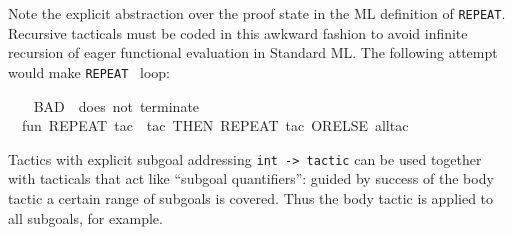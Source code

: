 \begin{isabellebody}
\begin{isamarkuptext}
  \begin{warn}
  Note the explicit abstraction over the proof state in the ML
  definition of \verb|REPEAT|.  Recursive tacticals must be coded in
  this awkward fashion to avoid infinite recursion of eager functional
  evaluation in Standard ML.  The following attempt would make \verb|REPEAT|~ loop:
  \end{warn}%
\end{isamarkuptext}%
\isamarkuptrue%
%
\isadelimML
%
\endisadelimML
%
\isatagML
{}\isamarkupfalse%
\ {}\isanewline
\ \ {}{}BAD\ {}{}\ does\ not\ terminate{}{}{}\isanewline
\ \ fun\ REPEAT\ tac\ {}\ {}tac\ THEN\ REPEAT\ tac{}\ ORELSE\ all{}tac{}\isanewline
{}%
\endisatagML
{\isafoldML}%
%
\isadelimML
%
\endisadelimML
%
\isamarkuptrue%
%
\begin{isamarkuptext}%
Tactics with explicit subgoal addressing
  \verb|int -> tactic| can be used together with tacticals that
  act like ``subgoal quantifiers'': guided by success of the body
  tactic a certain range of subgoals is covered.  Thus the body tactic
  is applied to all subgoals, for example.


\end{isamarkuptext}
\end{isabellebody}
